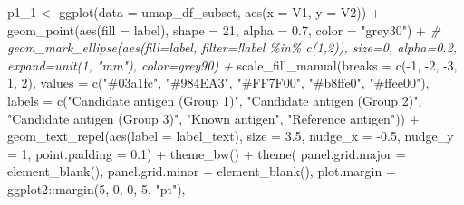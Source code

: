 \documentclass[
  11pt,
  oneside]{book}
\newenvironment{Shaded}{\begin{snugshade}}{\end{snugshade}}
\newcommand{\AttributeTok}[1]{\textcolor[rgb]{0.77,0.63,0.00}{#1}}
\newcommand{\CommentTok}[1]{\textcolor[rgb]{0.56,0.35,0.01}{\textit{#1}}}
\newcommand{\DecValTok}[1]{\textcolor[rgb]{0.00,0.00,0.81}{#1}}
\newcommand{\FloatTok}[1]{\textcolor[rgb]{0.00,0.00,0.81}{#1}}
\newcommand{\FunctionTok}[1]{\textcolor[rgb]{0.00,0.00,0.00}{#1}}
\newcommand{\NormalTok}[1]{#1}
\newcommand{\OtherTok}[1]{\textcolor[rgb]{0.56,0.35,0.01}{#1}}
\newcommand{\SpecialCharTok}[1]{\textcolor[rgb]{0.00,0.00,0.00}{#1}}
\newcommand{\StringTok}[1]{\textcolor[rgb]{0.31,0.60,0.02}{#1}}
\begin{document}
\begin{Shaded}
\begin{Highlighting}[]
\NormalTok{p1\_1 }\OtherTok{\textless{}{-}} \FunctionTok{ggplot}\NormalTok{(}\AttributeTok{data =}\NormalTok{ umap\_df\_subset, }\FunctionTok{aes}\NormalTok{(}\AttributeTok{x =} \StringTok{\textasciigrave{}}\AttributeTok{V1}\StringTok{\textasciigrave{}}\NormalTok{, }\AttributeTok{y =} \StringTok{\textasciigrave{}}\AttributeTok{V2}\StringTok{\textasciigrave{}}\NormalTok{)) }\SpecialCharTok{+}
  \FunctionTok{geom\_point}\NormalTok{(}\FunctionTok{aes}\NormalTok{(}\AttributeTok{fill =}\NormalTok{ label), }\AttributeTok{shape =} \DecValTok{21}\NormalTok{, }\AttributeTok{alpha =} \FloatTok{0.7}\NormalTok{, }\AttributeTok{color =} \StringTok{"grey30"}\NormalTok{) }\SpecialCharTok{+}
  \CommentTok{\# geom\_mark\_ellipse(aes(fill=label, filter=!label \%in\% c(1,2)), size=0, alpha=0.2, expand=unit(1, "mm"), color=\textquotesingle{}grey90\textquotesingle{}) +}
  \FunctionTok{scale\_fill\_manual}\NormalTok{(}\AttributeTok{breaks =} \FunctionTok{c}\NormalTok{(}\SpecialCharTok{{-}}\DecValTok{1}\NormalTok{, }\SpecialCharTok{{-}}\DecValTok{2}\NormalTok{, }\SpecialCharTok{{-}}\DecValTok{3}\NormalTok{, }\DecValTok{1}\NormalTok{, }\DecValTok{2}\NormalTok{), }\AttributeTok{values =} \FunctionTok{c}\NormalTok{(}\StringTok{"\#03a1fc"}\NormalTok{, }\StringTok{"\#984EA3"}\NormalTok{, }\StringTok{"\#FF7F00"}\NormalTok{, }\StringTok{"\#b8ffe0"}\NormalTok{, }\StringTok{"\#ffee00"}\NormalTok{), }\AttributeTok{labels =} \FunctionTok{c}\NormalTok{(}\StringTok{"Candidate antigen (Group 1)"}\NormalTok{, }\StringTok{"Candidate antigen (Group 2)"}\NormalTok{, }\StringTok{"Candidate antigen (Group 3)"}\NormalTok{, }\StringTok{"Known antigen"}\NormalTok{, }\StringTok{"Reference antigen"}\NormalTok{)) }\SpecialCharTok{+}
  \FunctionTok{geom\_text\_repel}\NormalTok{(}\FunctionTok{aes}\NormalTok{(}\AttributeTok{label =}\NormalTok{ label\_text), }\AttributeTok{size =} \FloatTok{3.5}\NormalTok{, }\AttributeTok{nudge\_x =} \SpecialCharTok{{-}}\FloatTok{0.5}\NormalTok{, }\AttributeTok{nudge\_y =} \DecValTok{1}\NormalTok{, }\AttributeTok{point.padding =} \FloatTok{0.1}\NormalTok{) }\SpecialCharTok{+}
  \FunctionTok{theme\_bw}\NormalTok{() }\SpecialCharTok{+}
  \FunctionTok{theme}\NormalTok{(}
    \AttributeTok{panel.grid.major =} \FunctionTok{element\_blank}\NormalTok{(),}
    \AttributeTok{panel.grid.minor =} \FunctionTok{element\_blank}\NormalTok{(),}
    \AttributeTok{plot.margin =}\NormalTok{ ggplot2}\SpecialCharTok{::}\FunctionTok{margin}\NormalTok{(}\DecValTok{5}\NormalTok{, }\DecValTok{0}\NormalTok{, }\DecValTok{0}\NormalTok{, }\DecValTok{5}\NormalTok{, }\StringTok{"pt"}\NormalTok{),}

\end{Highlighting}
\end{Shaded}
\end{document}
